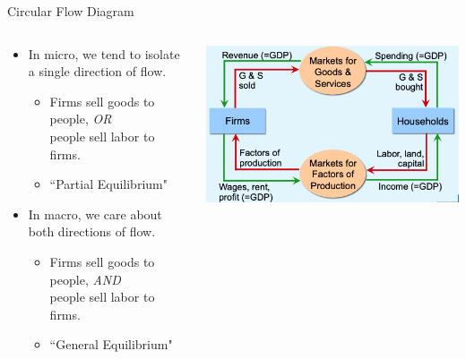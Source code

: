 \documentclass[9pt]{beamer}
\begin{document}
\begin{frame}{Circular Flow Diagram}
\begin{columns}[c]
\begin{column}{0.5\textwidth}
    \begin{itemize}
        \item In micro, we tend to isolate a single direction of flow.
        \vspace{5pt}
        \begin{itemize}
            \item Firms sell goods to people, \textit{OR} \\people sell labor to firms.
            \vspace{5pt}
            \item ``Partial Equilibrium"
        \end{itemize}
        \vspace{5pt}
        \item In macro, we care about both directions of flow.
        \vspace{5pt}
        \begin{itemize}
            \item Firms sell goods to people, \textit{AND} \\people sell labor to firms.
            \vspace{5pt}
            \item ``General Equilibrium"
        \end{itemize}
    \end{itemize}
    \end{column}
    \begin{column}{0.5\textwidth}
        \centering
        \includegraphics[width=\textwidth]{fig1.png}
    \end{column}
\end{columns}
\end{frame}
\end{document}
